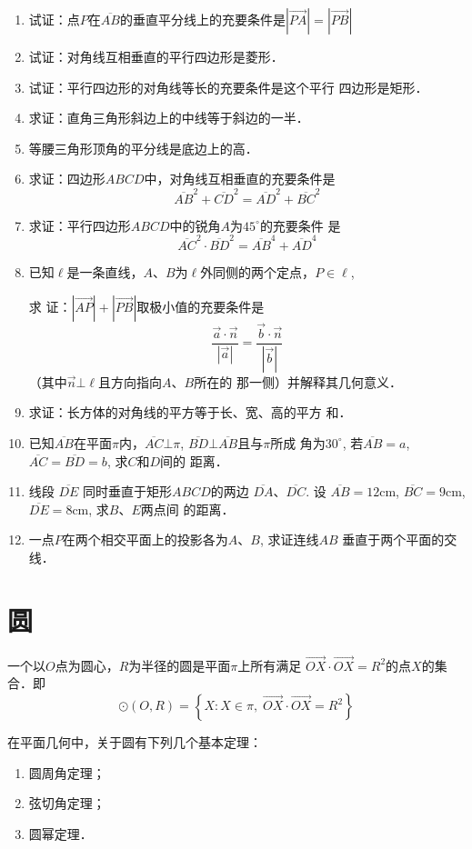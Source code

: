 \begin{enumerate}
    \item 试证：点$P$在$\overline{AB}$的垂直平分线上的充要条件是$|\Vec{PA}|=|\Vec{PB}|$
\item 试证：对角线互相垂直的平行四边形是菱形．
\item 试证：平行四边形的对角线等长的充要条件是这个平行
四边形是矩形．
\item 求证：直角三角形斜边上的中线等于斜边的一半．
\item 等腰三角形顶角的平分线是底边上的高．
\item 求证：四边形$ABCD$中，对角线互相垂直的充要条件是
\[\overline{AB}^2 +\overline{CD}^2=\overline{AD}^2+\overline{BC}^2\]
\item 求证：平行四边形$ABCD$中的锐角$A$为$45^{\circ}$的充要条件
是$$\overline{AC}^2\cdot \overline{BD}^2=\overline{AB}^4+\overline{AD}^4$$
\item 已知$\ell$是一条直线，$A$、$B$为$\ell$外同侧的两个定点，$P\in\ell$, 

求
证：$|\Vec{AP}|+|\Vec{PB}|$取极小值的充要条件是
\[\frac{\vec{a}\cdot \vec{n}}{|\vec{a}|}=\frac{\vec{b}\cdot \vec{n}}{|\vec{b}|}\]
（其中$\vec{n}\bot \ell$且方向指向$A$、$B$所在的
那一侧）并解释其几何意义．
\item 求证：长方体的对角线的平方等于长、宽、高的平方
和．
\item 已知$\overline{AB}$在平面$\pi$内，$\overline{AC}\bot\pi$, $\overline{BD}\bot \overline{AB}$且与$\pi$所成
角为$30^{\circ}$, 若$\overline{AB}=a$, $\overline{AC}=\overline{BD}=b$, 求$C$和$D$间的
距离．
\item 线段
$\overline{DE}$
同时垂直于矩形$ABCD$的两边
$\overline{DA}$、$\overline{DC}$. 设
$\overline{AB}=12$cm, $\overline{BC}=9$cm, $\overline{DE}
=8$cm, 求$B$、$E$两点间
的距离．
\item 一点$P$在两个相交平面上的投影各为$A$、$B$, 求证连线$AB$
垂直于两个平面的交线．
\end{enumerate}


\section{圆}

一个以$O$点为圆心，$R$为半径的圆是平面$\pi$上所有满足
$\Vec{OX}\cdot\Vec{OX}=R^2$的点$X$的集合．即
\[\odot (O,R)=\left\{X:X\in \pi,\; \Vec{OX}\cdot\Vec{OX}=R^2\right\}\]

在平面几何中，关于圆有下列几个基本定理：
\begin{enumerate}
\item 圆周角定理；
\item 弦切角定理；
\item 圆幂定理．
\end{enumerate}

